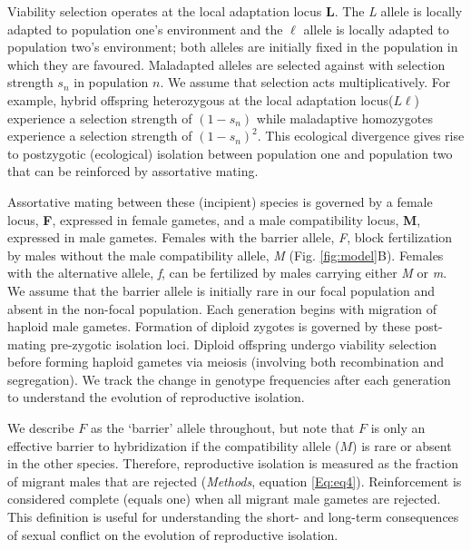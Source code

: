 \documentclass[11pt]{article}
\begin{document}
Viability selection operates at the local adaptation locus \textbf{L}. The \emph{L} allele is locally adapted to population one's environment and the \emph{$\ell$} allele is locally adapted to population two's environment; both alleles are initially fixed in the population in which they are favoured. Maladapted alleles are selected against with selection strength $s_n$ in population $n$.  We assume that selection acts multiplicatively. For example, hybrid offspring heterozygous at the local adaptation locus($L \ell$) experience a selection strength of $(1-s_n)$ while maladaptive homozygotes experience a selection strength of $(1-s_n)^2$. This ecological divergence gives rise to postzygotic (ecological) isolation between population one and population two that can be reinforced by assortative mating.

Assortative mating between these (incipient) species is governed by a female locus, \textbf{F}, expressed in female gametes, and a male compatibility locus, \textbf{M}, expressed in male gametes.  Females with the barrier allele, \emph{F}, block fertilization by males without the male compatibility allele, \emph{M} (Fig. \ref{fig:model}B).  Females with the alternative allele, \emph{f}, can be fertilized by males carrying either \emph{M} or \emph{m}.  We assume that the barrier allele is initially rare in our focal population and absent in the non-focal population. Each generation begins with migration of haploid male gametes.  Formation of diploid zygotes is governed by these post-mating pre-zygotic isolation loci.  Diploid offspring undergo viability selection before forming haploid gametes via meiosis (involving both recombination and segregation). We track the change in genotype frequencies after each generation to understand the evolution of reproductive isolation.

We describe $F$ as the `barrier' allele throughout, but note that $F$ is only an effective barrier to hybridization if the compatibility allele ($M$) is rare or absent in the other species.  Therefore, reproductive isolation is measured as the fraction of migrant males that are rejected (\emph{Methods}, equation \ref{Eq:eq4}). 
Reinforcement is considered complete (equals one) when all migrant male gametes are rejected.  This definition is useful for understanding the short- and long-term consequences of sexual conflict on the evolution of reproductive isolation. 
\end{document}
